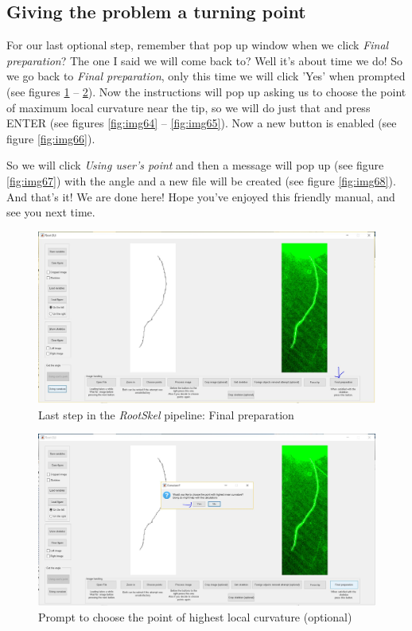 \subsection{Giving the problem a turning point}

For our last optional step, remember that pop up window when we click \textit{Final preparation}? The one I said we will come back to?
Well it's about time we do! So we go back to \textit{Final preparation}, only this time we will click 'Yes' when prompted (see figures \ref{fig:img62} -- \ref{fig:img63}).
Now the instructions will pop up asking us to choose the point of maximum local curvature near the tip, so we will do just that and press ENTER (see figures \ref{fig:img64} -- \ref{fig:img65}). Now a new button is enabled (see figure \ref{fig:img66}).

So we will click \textit{Using user's point} and then a message will pop up (see figure \ref{fig:img67}) with the angle and a new file will be created (see figure \ref{fig:img68}).
And that's it! We are done here! Hope you've enjoyed this friendly manual, and see you next time. 

\begin{figure}[H]
	\centering
	\includegraphics[width=\textwidth]{../Figures/manual/optionalE1.jpg}
	\caption{Last step in the \textit{RootSkel} pipeline: Final preparation}
	\label{fig:img62}
\end{figure}

\begin{figure}[H]
	\centering
	\includegraphics[width=\textwidth]{../Figures/manual/optionalE2.jpg}
	\caption{Prompt to choose the point of highest local curvature (optional)}
	\label{fig:img63}
\end{figure}


